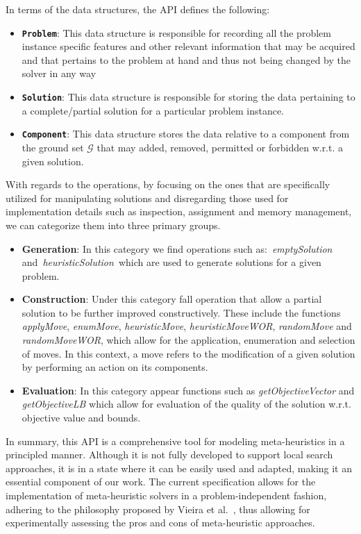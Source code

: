 In terms of the data structures, the API defines the following:

\begin{itemize}
      \item \textbf{\texttt{Problem}}: This data structure is responsible for recording
            all the problem instance specific features and other relevant information
            that may be acquired and that pertains to the problem at hand and thus not
            being changed by the solver in any way
      \item \textbf{\texttt{Solution}}: This data structure is responsible for storing the
            data pertaining to a complete/partial solution for a particular problem
            instance.
      \item \textbf{\texttt{Component}}: This data structure stores the data relative to a
            component from the ground set $\mathcal{G}$ that may added, removed, permitted
            or forbidden w.r.t. a given solution.
\end{itemize}

With regards to the operations, by focusing on the ones that are specifically
utilized for manipulating solutions and disregarding those used for
implementation details such as inspection, assignment and memory management, we can
categorize them into three primary groups.

\begin{itemize}
      \item \textbf{Generation}: In this category we find operations such
            as:~\textit{emptySolution} and~\textit{heuristicSolution}~which are used to
            generate solutions for a given problem.
      \item \textbf{Construction}: Under this category fall operation that
            allow a partial solution to be further improved constructively. These include
            the functions \textit{applyMove}, \textit{enumMove}, \textit{heuristicMove},
            \textit{heuristicMoveWOR}, \textit{randomMove} and \textit{randomMoveWOR},
            which allow for the application, enumeration and selection of moves.
            In this context, a move refers to the modification of a given solution by
            performing an action on its components.
      \item \textbf{Evaluation}: In this category appear functions such
            as \textit{getObjectiveVector} and \textit{getObjectiveLB} which allow for
            evaluation of the quality of the solution w.r.t. objective value and bounds.
\end{itemize}

In summary, this API is a comprehensive tool for modeling meta-heuristics in a
principled manner. Although it is not fully developed to support local search
approaches, it is in a state where it can be easily used and adapted, making it
an essential component of our work. The current specification allows
for the implementation of meta-heuristic solvers in a problem-independent
fashion, adhering to the philosophy proposed by Vieira et
al.~\cite{vieira2009uma}, thus allowing for experimentally assessing the pros
and cons of meta-heuristic approaches.